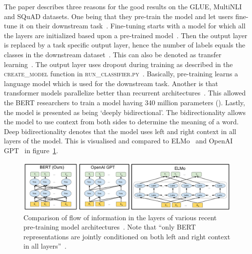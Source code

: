The paper describes three reasons for the good results on the GLUE, MultiNLI and SQuAD datasets.
One being that they pre-train the model and let users fine-tune it on their downstream task~\citep{devlin2018}.
Fine-tuning starts with a model for which all the layers are initialized based upon a pre-trained model~\citep{guo2016deep}.
Then the output layer is replaced by a task specific output layer, hence the number of labels equals the classes in the downstream dataset~\citep{guo2016deep}.
This can also be denoted as transfer learning~\citep{cirecsan2012transfer}.
The output layer uses dropout during training as described in the \textsc{create\_model} function in \textsc{run\_classifier.py}~\citep{devlin2019classifiers}.
Basically, pre-training learns a language model which is used for the downstream task.
Another is that transformer models parallelize better than recurrent architectures~\citep{vaswani2017attention}.
This allowed the BERT researchers to train a model having 340 million parameters (). %
Lastly, the model is presented as being `deeply bidirectional'.
The bidirectionality allows the model to use context from both sides to determine the meaning of a word.
Deep bidirectionality denotes that the model uses left and right context in all layers of the model.
This is visualised and compared to ELMo~\citep{peters2018} and OpenAI GPT~\citep{radford2018improving} in figure~\ref{fig:bert_comparison}.
\begin{figure}[htbp]
    \begin{center}
        \includegraphics[width=\textwidth]{figures/deeply_bidirectional.png}
    \end{center}
    \caption{
        Comparison of flow of information in the layers of various recent pre-training model architectures~\cite[Figure 1]{devlin2018}.
        Note that ``only BERT representations are jointly conditioned on both left and right context in all layers''~\citep{devlin2018}.
    }
    \label{fig:bert_comparison}
\end{figure}


